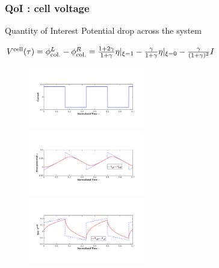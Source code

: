 \documentclass[10pt,xcolor=dvipsnames,compress]{beamer}
\begin{document}
\begin{frame}
\frametitle{QoI : cell voltage }
\vfill


\begin{alertblock}{Quantity of Interest}
 Potential drop across the system

 $V^{\rm cell}(\tau) = \phi_{\rm col.}^L - \phi_{\rm col.}^R
= \frac{1+2\gamma}{1+\gamma}\eta|_{\xi=1} - \frac{\gamma}{1+\gamma}\eta|_{\xi=0} - \frac{\gamma}{(1+\gamma)^2}I
 $
\end{alertblock} 


\begin{figure}[h]
    \centering
    \includegraphics[trim = 1.2in 2.4in 1.6in 2.8in, clip, width=0.45\textwidth]{figs/I.png}
    \\
    \includegraphics[trim = 1.2in 2.4in 1.6in 2.8in, clip, width=0.45\textwidth]{figs/etaLF_HF.png}   
    \\
    \includegraphics[trim = 1.2in 2.4in 1.6in 2.8in, clip, width=0.45\textwidth]{figs/Vcell_HF_LF.png} 
\end{figure}





\vfill
\end{frame}
\end{document}
